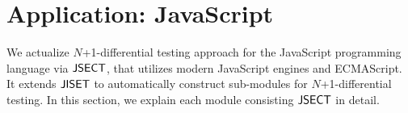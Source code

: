 \section{Application: JavaScript}\label{sec:application}

We actualize $N$+1-differential testing approach for the JavaScript programming
language via $\text{\sf JSECT}$, that utilizes modern JavaScript engines and ECMAScript.
It extends $\text{\sf JISET}$ to automatically construct sub-modules for $N$+1-differential
testing.  In this section, we explain each module consisting $\text{\sf JSECT}$ in detail.






